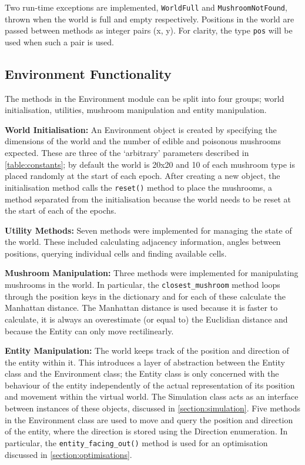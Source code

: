 \documentclass[12pt,a4paper]{report}
\begin{document}
Two run-time exceptions are implemented, \texttt{WorldFull} and \texttt{MushroomNotFound}, thrown when the world is full and empty respectively. Positions in the world are passed between methods as integer pairs (x, y). For clarity, the type \texttt{pos} will be used when such a pair is used.

\subsection{Environment Functionality}

The methods in the Environment module can be split into four groups; world initialisation, utilities, mushroom manipulation and entity manipulation.

{\bf World Initialisation:} An Environment object is created by specifying the dimensions of the world and the number of edible and poisonous mushrooms expected. These are three of the `arbitrary' parameters described in \cref{table:constants}; by default the world is 20x20 and 10 of each mushroom type is placed randomly at the start of each epoch. After creating a new object, the initialisation method calls the \texttt{reset()} method to place the mushrooms, a method separated from the initialisation because the world needs to be reset at the start of each of the epochs.

{\bf Utility Methods:} Seven methods were implemented for managing the state of the world. These included calculating adjacency information, angles between positions, querying individual cells and finding available cells.

{\bf Mushroom Manipulation:} Three methods were implemented for manipulating mushrooms in the world. In particular, the \texttt{closest\_mushroom} method loops through the position keys in the dictionary and for each of these calculate the Manhattan distance. The Manhattan distance is used because it is faster to calculate, it is always an overestimate (or equal to) the Euclidian distance and because the Entity can only move rectilinearly.

{\bf Entity Manipulation:} The world keeps track of the position and direction of the entity within it. This introduces a layer of abstraction between the Entity class and the Environment class; the Entity class is only concerned with the behaviour of the entity independently of the actual representation of its position and movement within the virtual world. The Simulation class acts as an interface between instances of these objects, discussed in \cref{section:simulation}. Five methods in the Environment class are used to move and query the position and direction of the entity, where the direction is stored using the Direction enumeration. In particular, the \texttt{entity\_facing\_out()} method is used for an optimisation discussed in \cref{section:optimisations}.
\end{document}
